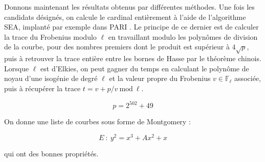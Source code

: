 \documentclass[11pt,a4paper]{article}
\newcommand{\F}{\mathbb{F}}
\renewcommand{\mod}{\ \mathrm{mod}\ }
\theoremstyle{definition}
\begin{document}
Donnons maintenant les résultats obtenus par différentes méthodes. Une fois les candidats désignés, on calcule le cardinal entièrement à l'aide de l'algorithme SEA, implanté par exemple dans PARI \cite{PARI}. Le principe de ce dernier est de calculer la trace du Frobenius modulo $\ell$ en travaillant modulo les polynômes de division de la courbe, pour des nombres premiers dont le produit est supérieur à $4\sqrt{p}$, puis à retrouver la trace entière entre les bornes de Hasse par le théorème chinois. Lorsque $\ell$ est d'Elkies, on peut gagner du temps en calculant le polynôme de noyau d'une isogénie de degré $\ell$ et la valeur propre du Frobenius $v\in \F_\ell$ associée, puis à récupérer la trace $t = v + p/v \mod\ell.$


$$p = 2^{502} + 49$$

On donne une liste de courbes sous forme de Montgomery :

$$E\ :\ y^2 = x^3 + A x^2 + x$$

qui ont des bonnes propriétés.
\end{document}
